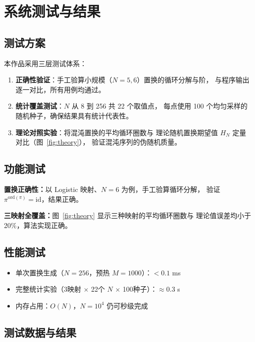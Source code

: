 \documentclass[12pt, a4paper]{article}
\begin{document}
\section{系统测试与结果}

\subsection{测试方案}

本作品采用三层测试体系：
\begin{enumerate}
  \item \textbf{正确性验证}：手工验算小规模（$N=5,6$）置换的循环分解与阶，
        与程序输出逐一对比，所有用例均通过。
  \item \textbf{统计覆盖测试}：$N$ 从 8 到 256 共 22 个取值点，
        每点使用 100 个均匀采样的随机种子，确保结果具有统计代表性。
  \item \textbf{理论对照实验}：将混沌置换的平均循环圈数与
        理论随机置换期望值 $H_N$ 定量对比（图~\ref{fig:theory}），
        验证混沌序列的伪随机质量。
\end{enumerate}

\subsection{功能测试}

\textbf{置换正确性：}以 Logistic 映射、$N=6$ 为例，手工验算循环分解，
验证 $\pi^{\mathrm{ord}(\pi)}=\mathrm{id}$，结果正确。

\textbf{三映射全覆盖：}图~\ref{fig:theory} 显示三种映射的平均循环圈数与
理论值误差均小于 20\%，算法实现正确。

\subsection{性能测试}

\begin{itemize}
  \item 单次置换生成（$N=256$，预热 $M=1000$）：$<0.1$ ms
  \item 完整统计实验（3映射 $\times$ 22个 $N$ $\times$ 100种子）：$\approx 0.3$ s
  \item 内存占用：$O(N)$，$N=10^4$ 仍可秒级完成
\end{itemize}

\subsection{测试数据与结果}
\end{document}
